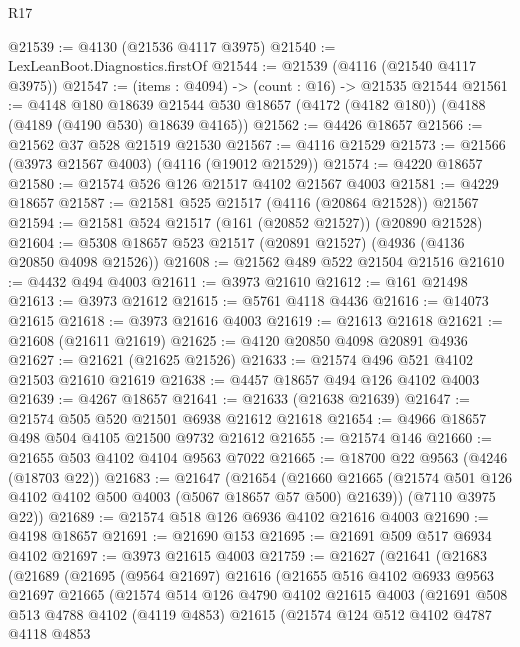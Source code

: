 \begin{lexlean}{R17}
\begin{coremodule}
@21539 := @4130 (@21536 @4117 @3975)
@21540 := LexLeanBoot.Diagnostics.firstOf
@21544 := @21539 (@4116 (@21540 @4117 @3975))
@21547 := (items : @4094) -> (count : @16) -> @21535 @21544
@21561 := @4148
    @180
    @18639
    @21544
    @530
    @18657
    (@4172 (@4182 @180))
    (@4188 (@4189 (@4190 @530) @18639 @4165))
@21562 := @4426 @18657
@21566 := @21562 @37 @528 @21519 @21530
@21567 := @4116 @21529
@21573 := @21566 (@3973 @21567 @4003) (@4116 (@19012 @21529))
@21574 := @4220 @18657
@21580 := @21574 @526 @126 @21517 @4102 @21567 @4003
@21581 := @4229 @18657
@21587 := @21581 @525 @21517 (@4116 (@20864 @21528)) @21567
@21594 := @21581 @524 @21517 (@161 (@20852 @21527)) (@20890 @21528)
@21604 := @5308 @18657 @523 @21517 (@20891 @21527) (@4936 (@4136 @20850 @4098 @21526))
@21608 := @21562 @489 @522 @21504 @21516
@21610 := @4432 @494 @4003
@21611 := @3973 @21610
@21612 := @161 @21498
@21613 := @3973 @21612
@21615 := @5761 @4118 @4436
@21616 := @14073 @21615
@21618 := @3973 @21616 @4003
@21619 := @21613 @21618
@21621 := @21608 (@21611 @21619)
@21625 := @4120 @20850 @4098 @20891 @4936
@21627 := @21621 (@21625 @21526)
@21633 := @21574 @496 @521 @4102 @21503 @21610 @21619
@21638 := @4457 @18657 @494 @126 @4102 @4003
@21639 := @4267 @18657
@21641 := @21633 (@21638 @21639)
@21647 := @21574 @505 @520 @21501 @6938 @21612 @21618
@21654 := @4966 @18657 @498 @504 @4105 @21500 @9732 @21612
@21655 := @21574 @146
@21660 := @21655 @503 @4102 @4104 @9563 @7022
@21665 := @18700 @22 @9563 (@4246 (@18703 @22))
@21683 := @21647
    (@21654
      (@21660 @21665 (@21574 @501 @126 @4102 @4102 @500 @4003 (@5067 @18657 @57 @500) @21639))
      (@7110 @3975 @22))
@21689 := @21574 @518 @126 @6936 @4102 @21616 @4003
@21690 := @4198 @18657
@21691 := @21690 @153
@21695 := @21691 @509 @517 @6934 @4102
@21697 := @3973 @21615 @4003
@21759 := @21627
    (@21641
      (@21683
        (@21689
          (@21695
            (@9564 @21697)
            @21616
            (@21655
              @516
              @4102
              @6933
              @9563
              @21697
              @21665
              (@21574
                @514
                @126
                @4790
                @4102
                @21615
                @4003
                (@21691
                  @508
                  @513
                  @4788
                  @4102
                  (@4119 @4853)
                  @21615
                  (@21574
                    @124
                    @512
                    @4102
                    @4787
                    @4118
                    @4853

\end{coremodule}
\end{lexlean}
